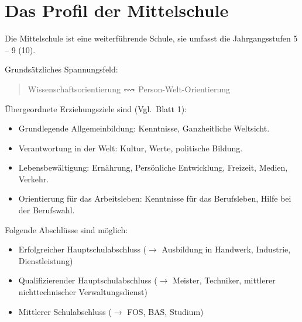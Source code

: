 \section{Das Profil der Mittelschule}\label{Mittelschule} 
Die Mittelschule ist
eine weiterf\"{u}hrende Schule, sie umfasst die Jahrgangsstufen
5 -- 9 (10).

Grunds\"{a}tzliches Spannungsfeld:
\begin{quote}
	Wissenschaftsorientierung   \q $\leftrightsquigarrow$\q
	Person-Welt-Orientierung
\end{quote}

\mip
\"{U}bergeordnete Erziehungsziele sind (Vgl.\ Blatt 1):

\begin{itemize}
	\item
	Grundlegende Allgemeinbildung: Kenntnisse, Ganzheitliche Weltsicht.
	\item
	Verantwortung in der Welt: Kultur, Werte, politische Bildung.
	\item
	Lebensbew\"{a}ltigung: Ern\"{a}hrung, Pers\"{o}nliche Entwicklung,
	Freizeit, Medien, Verkehr.
	\item
	Orientierung f\"{u}r das Arbeitsleben: Kenntnisse f\"{u}r das
	Berufsleben, Hilfe bei der Berufswahl.
\end{itemize}

Folgende Abschl\"{u}sse sind m\"{o}glich:
\begin{itemize}
	\item
	Erfolgreicher Hauptschulabschluss
	($\to$ Ausbildung in Handwerk, Industrie, Dienstleistung)
	\item
	Qualifizierender Hauptschulabschluss
	($\to$ Meister, Techniker, mittlerer nichttechnischer
	Verwaltungsdienst)
	\item
	Mittlerer Schulabschluss ($\to$ FOS, BAS, Studium)
\end{itemize}

\mip
{}

